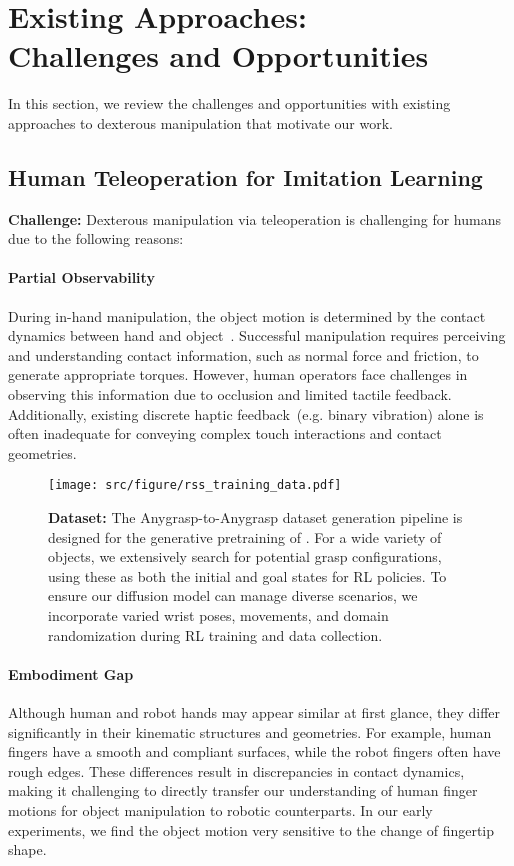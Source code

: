 \section{Existing Approaches: \\ Challenges and Opportunities}
\label{sec:background}
In this section, we review the challenges and opportunities with existing approaches to dexterous manipulation that motivate our work. 
\subsection{Human Teleoperation for Imitation Learning}
\textbf{Challenge:}
Dexterous manipulation via teleoperation is challenging for humans due to the following reasons:
\paragraph{Partial Observability} During in-hand manipulation, the object motion is determined by the contact dynamics between hand and object~\cite{trinkle1990planning, okamura2000overview,ji2001planning}. Successful manipulation requires perceiving and understanding contact information, such as normal force and friction, to generate appropriate torques. However, human operators face challenges in observing this information due to occlusion and limited tactile feedback. Additionally, existing discrete haptic feedback~(e.g. binary vibration) alone is often inadequate for conveying complex touch interactions and contact geometries.

\begin{figure*}[t]
    \centering
    \texttt{[image: src/figure/rss\_training\_data.pdf]}
    \caption{\textbf{Dataset:} The Anygrasp-to-Anygrasp dataset generation pipeline is designed for the generative pretraining of \mname. For a wide variety of objects, we extensively search for potential grasp configurations, using these as both the initial and goal states for RL policies. To ensure our diffusion model can manage diverse scenarios, we incorporate varied wrist poses, movements, and domain randomization during RL training and data collection.}
    \label{fig:dataset}
\end{figure*}
\paragraph{Embodiment Gap} Although human and robot hands may appear similar at first glance, they differ significantly in their kinematic structures and geometries. For example, human fingers have a smooth and compliant surfaces, while the robot fingers often have rough edges. These differences result in discrepancies in contact dynamics, making it challenging to directly transfer our understanding of human finger motions for object manipulation to robotic counterparts. In our early experiments, we find the object motion very sensitive to the change of fingertip shape.

